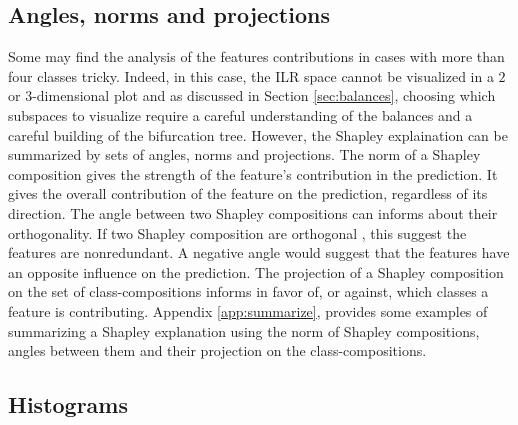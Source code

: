 \documentclass{article}
\theoremstyle{plain}
\theoremstyle{definition}
\theoremstyle{remark}
\begin{document}
\subsection{Angles, norms and projections}

Some may find the analysis of the features contributions in cases with more than four classes tricky. Indeed, in this case, the ILR space cannot be visualized in a $2$ or $3$-dimensional plot and as discussed in Section \ref{sec:balances}, choosing which subspaces to visualize require a careful understanding of the balances and a careful building of the bifurcation tree. However, the Shapley explaination can be summarized by sets of angles, norms and projections. The norm of a Shapley composition gives the strength of the feature's contribution in the prediction. It gives the overall contribution of the feature on the prediction, regardless of its direction. The angle between two Shapley compositions can informs about their orthogonality. If two Shapley composition are orthogonal%
, this suggest the features are nonredundant. A negative angle would suggest that the features have an opposite influence on the prediction. The projection of a Shapley composition on the set of class-compositions informs in favor of, or against, which classes a feature is contributing. Appendix \ref{app:summarize}, provides some examples of summarizing a Shapley explanation using the norm of Shapley compositions, angles between them and their projection on the class-compositions.

\subsection{Histograms}
\end{document}
